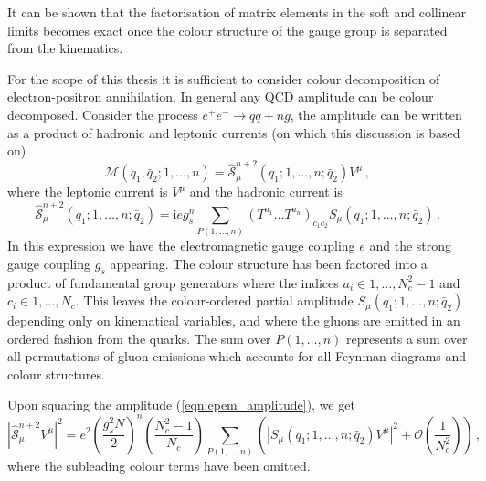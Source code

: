 \documentclass[main.tex]{subfiles}
\begin{document}
    It can be shown that the factorisation of matrix
    elements in the soft and collinear limits becomes
    exact once the colour structure of the gauge group
    is separated from the kinematics. 

    For the scope of this thesis it is sufficient
    to consider colour decomposition of electron-positron
    annihilation. In general any QCD amplitude can be
    colour decomposed. Consider the process $e^{+}e^{-} \rightarrow q\bar{q} + n g$,
    the amplitude can be written as a product of hadronic and
    leptonic currents \cite{Campbell:1998nn} (on which this discussion is based on)
    \begin{equation}\label{eqn:epem_amplitude}
        \mathcal{M}(q_{1}, \bar{q}_{2}; 1, \ldots, n) = \hat{\mathcal{S}}_{\mu}^{n+2}(q_{1}; 1,\ldots,n; \bar{q}_{2})V^{\mu} \, ,
    \end{equation}
    where the leptonic current is $V^{\mu}$ and the hadronic
    current is
    \begin{equation}\label{eqn:hadronic_current}
        \hat{\mathcal{S}}_{\mu}^{n+2}(q_{1};1,\ldots,n;\bar{q}_{2}) = \mathrm{i}eg_{s}^{n} \sum_{P(1,\ldots,n)}(T^{a_{1}} \ldots T^{a_{n}})_{c_{1}c_{2}}S_{\mu}(q_{1};1,\ldots,n;\bar{q}_{2}) \, .
    \end{equation}
    In this expression we have the electromagnetic gauge coupling
    $e$ and the strong gauge coupling $g_{s}$ appearing. The colour
    structure has been factored into a product of fundamental group
    generators where the indices $a_{i} \in {1,\ldots, N_{c}^{2}-1}$
    and $c_{i} \in {1,\ldots,N_{c}}$. This leaves the colour-ordered
    partial amplitude $S_{\mu}(q_{1};1,\ldots,n;\bar{q}_{2})$ depending
    only on kinematical variables, and where the gluons are emitted in an
    ordered fashion from the quarks. The sum over $P(1,\ldots,n)$
    represents a sum over all permutations of gluon emissions
    which accounts for all Feynman diagrams and colour structures.

    Upon squaring the amplitude (\ref{eqn:epem_amplitude}), we get
    \begin{equation}\label{eqn:epem_me2}
        \left|\hat{\mathcal{S}}_{\mu}^{n+2}V^{\mu}\right|^{2} = e^{2}\left(\dfrac{g_{s}^{2}N}{2}\right)^{n}\left(\dfrac{N_{c}^{2}-1}{N_{c}}\right) \sum_{P(1,\ldots,n)} \left(\left|S_{\mu}(q_{1};1,\ldots,n;\bar{q}_{2})V^{\mu}\right|^{2} + \mathcal{O}\left(\dfrac{1}{N_{c}^{2}}\right)\right) \, ,
    \end{equation}
    where the subleading colour terms have been omitted.
\end{document}
